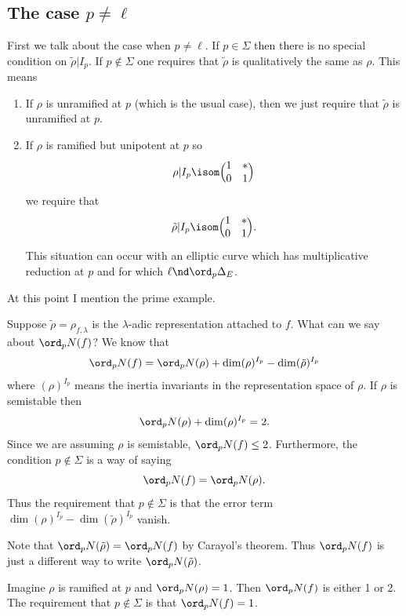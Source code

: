 \documentclass{report}
\begin{document}
\subsection{The case $p\neq\ell$}
First we talk about the case when $p\neq\ell$.
If $p\in\Sigma$ then there is no special condition on $\tilde{\rho}|I_p$.
If $p\not\in\Sigma$ one requires that $\tilde{\rho}$ is qualitatively
the same as $\rho$. This means
\begin{enumerate}
\item If $\rho$ is unramified at $p$ (which is the usual case), then
we just require that $\tilde{\rho}$ is unramified at $p$.
\item If $\rho$ is ramified but unipotent at $p$ so
$$\rho|I_p\isom
    \Bigl(\begin{matrix}1&*\\0&1\end{matrix}\Bigr)$$
we require that
$$\tilde{\rho}|I_p\isom
    \Bigl(\begin{matrix}1&*\\0&1\end{matrix}\Bigr).$$
This situation can occur with an elliptic curve which has multiplicative
reduction at $p$ and for which $\ell\nd\ord_p\Delta_E$.
\end{enumerate}

At this point I mention the prime example.
\begin{example} Suppose
$\tilde{\rho}=\rho_{f,\lambda}$ is the $\lambda$-adic representation
attached to $f$. What can we say about $\ord_p N(f)$? We know that
$$\ord_p N(f)=\ord_p N(\rho) + \dim (\rho)^{I_p} - \dim (\tilde{\rho})^{I_p}$$
where $(\rho)^{I_p}$ means the inertia invariants in the representation
space of $\rho$. If $\rho$ is semistable then
$$\ord_p N(\rho)+\dim (\rho)^{I_p} = 2.$$
Since we are assuming $\rho$ is semistable,
$\ord_p N(f)\leq 2$. Furthermore, the condition
$p\not\in\Sigma$ is a way of saying
$$\ord_p N(f) = \ord_p N(\rho). $$
Thus the requirement that $p\not\in\Sigma$ is that the
error term $\dim(\rho)^{I_p}-\dim(\tilde{\rho})^{I_p}$ vanish.

Note that $\ord_p N(\tilde{\rho})=\ord_p N(f)$ by Carayol's theorem.
Thus $\ord_p N(f)$ is just a different way to write $\ord_p N(\tilde{\rho})$.
\end{example}

\begin{example}
Imagine $\rho$ is ramified at $p$ and $\ord_p N(\rho)=1$.
Then $\ord_p N(f)$ is either 1 or 2. The requirement that $p\not\in\Sigma$
is that $\ord_p N(f)=1$.
\end{example}
\end{document}
